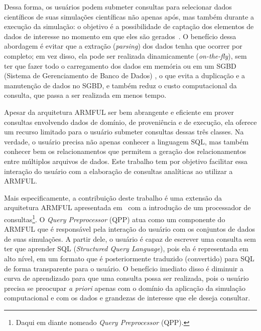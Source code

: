 Dessa forma, os usuários podem submeter consultas para selecionar dados científicos de suas simulações científicas não apenas após, mas também durante a execução da simulação: o objetivo é a possibilidade de captação dos elementos de dados de interesse no momento em que eles são gerados~\cite{silva2015analyzing}. O benefício dessa abordagem é evitar que a extração (\textit{parsing}) dos dados tenha que ocorrer por completo; em vez disso, ela pode ser realizada dinamicamente (\textit{on-the-fly}), sem ter que fazer todo o carregamento dos dados em memória ou em um SGBD (Sistema de Gerenciamento de Banco de Dados) , o que evita a duplicação e a manutenção de dados no SGBD, e também reduz o custo computacional da consulta, que passa a ser realizada em menos tempo.

Apesar da arquitetura ARMFUL ser bem abrangente e eficiente em prover consultas envolvendo dados de domínio, de proveniência e de execução, ela oferece um recurso limitado para o usuário submeter consultas dessas três classes. Na verdade, o usuário precisa não apenas conhecer a linguagem SQL, mas também conhecer bem os relacionamentos que permitem a geração dos relacionamentos entre múltiplos arquivos de dados.
Este trabalho tem por objetivo facilitar essa interação do usuário com a elaboração de consultas analíticas ao utilizar a ARMFUL.

Mais especificamente, a contribuição deste trabalho é uma extensão da arquitetura ARMFUL apresentada em~\cite{silva2016situ,silva2017raw} com a introdução de um processador de consultas\footnote{Daqui em diante nomeado \textit{Query Preprocessor} (QPP).}.
O  \textit{Query Preprocessor} (QPP) atua como um componente do ARMFUL que é responsável pela interação do usuário com os conjuntos de dados de suas simulações. A partir dele, o usuário é capaz de escrever uma consulta sem ter que aprender  SQL (\textit{Structured Query Language}), pois ela é representada em alto nível, em um formato que é posteriormente traduzido (convertido) para SQL de forma transparente para o usuário. O benefício imediato disso é diminuir a curva de aprendizado para que uma consulta possa ser realizada, pois o usuário precisa se preocupar \textit{a priori} apenas com o domínio da aplicação da simulação computacional e com os dados e grandezas de interesse que ele deseja consultar.

